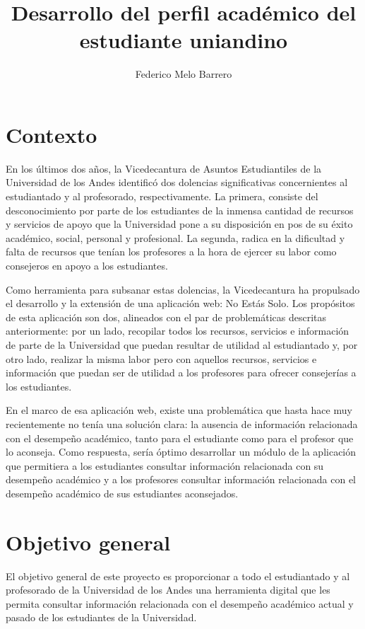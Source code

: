 \documentclass{fmbproyectogrado}
\title{Desarrollo del perfil académico del estudiante uniandino}
\author{Federico Melo Barrero\inst{1}}
\begin{document}
\maketitle

\section{Contexto}

En los últimos dos años, la Vicedecantura de Asuntos Estudiantiles de la Universidad de los Andes identificó dos dolencias significativas concernientes al estudiantado y al profesorado, respectivamente. La primera, consiste del desconocimiento por parte de los estudiantes de la inmensa cantidad de recursos y servicios de apoyo que la Universidad pone a su disposición en pos de su éxito académico, social, personal y profesional. La segunda, radica en la dificultad y falta de recursos que tenían los profesores a la hora de ejercer su labor como consejeros en apoyo a los estudiantes.

Como herramienta para subsanar estas dolencias, la Vicedecantura ha propulsado el desarrollo y la extensión de una aplicación web: No Estás Solo. Los propósitos de esta aplicación son dos, alineados con el par de problemáticas descritas anteriormente: por un lado, recopilar todos los recursos, servicios e información de parte de la Universidad que puedan resultar de utilidad al estudiantado y, por otro lado, realizar la misma labor pero con aquellos recursos, servicios e información que puedan ser de utilidad a los profesores para ofrecer consejerías a los estudiantes.

En el marco de esa aplicación web, existe una problemática que hasta hace muy recientemente no tenía una solución clara: la ausencia de información relacionada con el desempeño académico, tanto para el estudiante como para el profesor que lo aconseja. Como respuesta, sería óptimo desarrollar un módulo de la aplicación que permitiera a los estudiantes consultar información relacionada con su desempeño académico y a los profesores consultar información relacionada con el desempeño académico de sus estudiantes aconsejados.


\section{Objetivo general}

El objetivo general de este proyecto es proporcionar a todo el estudiantado y al profesorado de la Universidad de los Andes una herramienta digital que les permita consultar información relacionada con el desempeño académico actual y pasado de los estudiantes de la Universidad.
\end{document}

